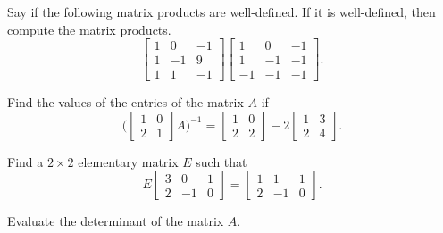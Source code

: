 \documentclass[addpoints, 12pt]{exam}%
\theoremstyle{definition}
\begin{document}
\begin{questions}

\question[10]
Say if the following matrix products are well-defined. If it is well-defined, then compute the matrix products.
$$
  \begin{bmatrix} 1 & 0 & -1 \\ 1 & -1 & 9 \\ 1 & 1 & -1 \end{bmatrix} \begin{bmatrix} 1 & 0 & -1 \\ 1 & -1 & -1 \\ -1 & -1 & -1 \end{bmatrix} .
$$

\newpage 

\question[10]

Find the values of the entries of the matrix $A$ if
  \[
    \Big( \begin{bmatrix} 1 & 0 \\ 2 & 1 \end{bmatrix} A \Big)^{-1} = \begin{bmatrix} 1 & 0 \\ 2 & 2 \end{bmatrix} - 2 \begin{bmatrix} 1 & 3 \\ 2 & 4 \end{bmatrix} .
  \]


\newpage 

\question[10]

Find a $2 \times 2$ elementary matrix $E$ such that
  \[
    E  \begin{bmatrix} 3 & 0 & 1 \\ 2 & -1 & 0 \end{bmatrix} = \begin{bmatrix} 1 & 1 & 1 \\ 2 & -1 & 0 \end{bmatrix} .
  \]

\newpage 

\question 
Evaluate the determinant of the matrix $A$.

\begin{multicols}{2}
\end{multicols}
\end{questions}
\end{document}
